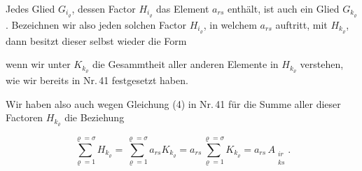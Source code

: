 
Jedes Glied $G_{i_\varrho}$, dessen Factor $H_{i_\varrho}$ das Element $a_{rs}$ enthält, ist auch ein Glied $G_{k_\varrho}$. Bezeichnen wir also jeden solchen Factor $H_{i_\varrho}$, in welchem $a_{rs}$ auftritt, mit $H_{k_\varrho}$, dann besitzt dieser selbst wieder die Form


wenn wir unter $K_{k_\varrho}$ die Gesammtheit aller anderen Elemente in $H_{k_\varrho}$ verstehen, wie wir bereits in Nr.\,41 festgesetzt haben.

Wir haben also auch wegen Gleichung (4) in Nr.\,41 für die Summe aller dieser Factoren $H_{k_\varrho}$ die Beziehung

\[
\sum_{\varrho=1}^{\varrho=\sigma} H_{k_\varrho} = \sum_{\varrho=1}^{\varrho=\sigma} a_{rs} K_{k_\varrho} = a_{rs}\sum_{\varrho=1}^{\varrho=\sigma} K_{k_\varrho} = a_{rs}\,A_{\substack{ir\\ks}}.
\]


